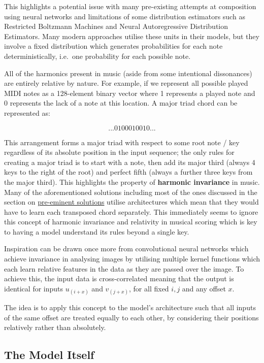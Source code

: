 \documentclass[12pt,]{article}
\begin{document}
This highlights a potential issue with many pre-existing attempts at
composition using neural networks and limitations of some distribution
estimators such as Restricted Boltzmann Machines and Neural
Autoregressive Distribution Estimators. Many modern approaches utilise
these units in their models, but they involve a fixed distribution which
generates probabilities for each note deterministically, i.e.~one
probability for each possible note.

All of the harmonics present in music (aside from some intentional
dissonances) are entirely relative by nature. For example, if we
represent all possible played MIDI notes as a 128-element binary vector
where 1 represents a played note and 0 represents the lack of a note at
this location. A major triad chord can be represented as:

\[... 0100010010 ...\]

This arrangement forms a major triad with respect to some root note /
key regardless of its absolute position in the input sequence; the only
rules for creating a major triad is to start with a note, then add its
major third (always 4 keys to the right of the root) and perfect fifth
(always a further three keys from the major third). This highlights the
property of \textbf{harmonic invariance} in music. Many of the
aforementioned solutions including most of the ones discussed in the
section on \protect\hyperlink{competitiveexistingsolutions}{pre-eminent
solutions} utilise architectures which mean that they would have to
learn each transposed chord separately. This immediately seems to ignore
this concept of harmonic invariance and relativity in musical scoring
which is key to having a model understand its rules beyond a single key.

Inspiration can be drawn once more from convolutional neural networks
which achieve invariance in analysing images by utilising multiple
kernel functions which each learn relative features in the data as they
are passed over the image. To achieve this, the input data is
cross-correlated meaning that the output is identical for inputs
\(u_{(i + x)}\) and \(v_{(j+x)}\), for all fixed \(i,j\) and any offset
\(x\).

The idea is to apply this concept to the model's architecture such that
all inputs of the same offset are treated equally to each other, by
considering their positions relatively rather than absolutely.

\hypertarget{the-model-itself}{%
\subsection{The Model Itself}\label{the-model-itself}}
\end{document}
